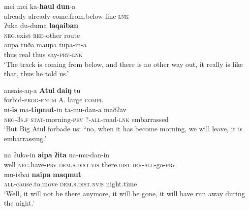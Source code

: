 \documentclass[output=paper
,modfonts
,nonflat]{langsci/langscibook}
\begin{document}
\begin{exe}
	\label{tx1-4}
	\begin{xlist}
		\ex\label{tx1-4a}
		\gll mei  mei  ka-\textbf{haul}  \textbf{dun}-a\\
		already  already  come.from.below  line-\textsc{lnk}\\
		\ex\label{tx1-4b}
		\gll ʔuka  du-duma  \textbf{laqaiban}\\
		\textsc{neg}.exist  \textsc{red}-other  route\\
		\ex\label{tx1-4c}
		\gll aupa  tuða  maupa  tupa-in-a\\
		thus  real  thus  say-\textsc{prv}-\textsc{lnk}\\
		\glt `The track is coming from below, and there is no other way out, it really is like that, thus he told us.’
	\end{xlist}
\end{exe}

\begin{exe}
	\label{tx1-5}
	\begin{xlist}
		\ex\label{tx1-5a}
		\gll ansais-aŋ-a  \textbf{Atul} \textbf{daiŋ}  tu\\
		forbid-\textsc{prog}-\textsc{enum}  \textsc{A.}  large  \textsc{compl}\\
		\ex\label{tx1-5b}
		\gll ni-\textbf{is}  ma-\textbf{tiŋmut}-in  ta-mu-dan-a  maðʔav\\
		\textsc{neg}-\textsc{3s}.\textsc{f}  \textsc{stat}-morning-\textsc{prv}  ?-\textsc{all}-road-\textsc{lnk}  embarrassed\\
		\glt `But Big Atul forbade us: “no, when it has become morning, we will leave, it is embarrassing.’
	\end{xlist}
\end{exe}

\begin{exe}
	\label{tx1-6}
	\begin{xlist}
		\ex\label{tx1-6a}
		\gll na  ʔuka-in  \textbf{aipa}  \textbf{ʔita}  na-mu-dan-in\\
		well  \textsc{neg}.have-\textsc{prv}  \textsc{dem}.\textsc{s}.\textsc{dist}.\textsc{vis}  there.\textsc{dist}  \textsc{irr}-\textsc{all}-go-\textsc{prv}\\
		\ex\label{tx1-6b}
		\gll mu-isbai  \textbf{naipa}  \textbf{maqmut}\\
		\textsc{all}-cause.to.move  \textsc{dem}.\textsc{s}.\textsc{dist}.\textsc{nvis}  night.time\\
		\glt `Well, it will not be there anymore, it will be gone, it will have run away during the night.’
	\end{xlist}
\end{exe}
\end{document}
